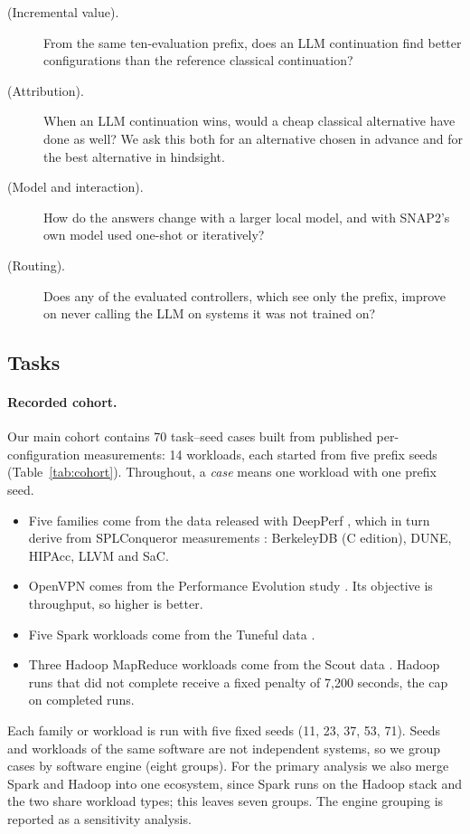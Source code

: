 \begin{description}
  \item[ (Incremental value).] From the same ten-evaluation prefix, does an LLM continuation find better configurations than the reference classical continuation?
  \item[ (Attribution).] When an LLM continuation wins, would a cheap classical alternative have done as well? We ask this both for an alternative chosen in advance and for the best alternative in hindsight.
  \item[ (Model and interaction).] How do the answers change with a larger local model, and with SNAP2's own model used one-shot or iteratively?
  \item[ (Routing).] Does any of the evaluated controllers, which see only the prefix, improve on never calling the LLM on systems it was not trained on?
\end{description}

\subsection{Tasks}

\paragraph{Recorded cohort.} Our main cohort contains 70 task--seed cases built from published per-configuration measurements: 14 workloads, each started from five prefix seeds (Table~\ref{tab:cohort}). Throughout, a \emph{case} means one workload with one prefix seed.
\begin{itemize}
  \item Five families come from the data released with DeepPerf \cite{ha2019deepperf}, which in turn derive from SPLConqueror measurements \cite{siegmund2015influence}: BerkeleyDB (C edition), DUNE, HIPAcc, LLVM and SaC.
  \item OpenVPN comes from the Performance Evolution study \cite{kaltenecker2023evolution}. Its objective is throughput, so higher is better.
  \item Five Spark workloads come from the Tuneful data \cite{fekry2020tuneful}.
  \item Three Hadoop MapReduce workloads come from the Scout data \cite{hsu2018scout}. Hadoop runs that did not complete receive a fixed penalty of 7,200 seconds, the cap on completed runs.
\end{itemize}
Each family or workload is run with five fixed seeds (11, 23, 37, 53, 71). Seeds and workloads of the same software are not independent systems, so we group cases by software engine (eight groups). For the primary analysis we also merge Spark and Hadoop into one ecosystem, since Spark runs on the Hadoop stack and the two share workload types; this leaves seven groups. The engine grouping is reported as a sensitivity analysis.

